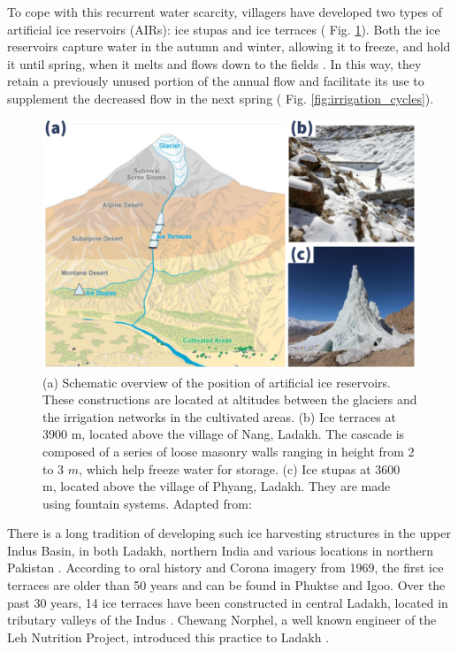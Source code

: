To cope with this recurrent water scarcity, villagers have developed two types of artificial ice reservoirs
(AIRs): ice stupas and ice terraces ( Fig. \ref{fig:AIRforms}). Both the ice reservoirs capture water in the
autumn and winter, allowing it to freeze, and hold it until spring, when it melts and flows down to the fields
\citep{ipccChapterHighMountain2019, vinceGlacierMan2009, clouseLadakhArtificialGlaciers2017,
nusserSociohydrologyArtificialGlaciers2019}. In this way, they retain a previously unused portion of the annual
flow and facilitate its use to supplement the decreased flow in the next spring ( Fig.
\ref{fig:irrigation_cycles}).

\begin{figure}[t]
\centering
\includegraphics[width=12cm]{figs/AIR_forms.jpg}

\caption{(a) Schematic overview of the position of artificial ice reservoirs. These constructions are located at
  altitudes between the glaciers and the irrigation networks in the cultivated areas. (b) Ice terraces at 3900
  m, located above the village of Nang, Ladakh. The cascade is composed of a series of loose masonry walls
  ranging in height from 2 to 3 $m$, which help freeze water for storage. (c) Ice stupas at 3600 m, located
above the village of Phyang, Ladakh. They are made using fountain systems. Adapted from:
\cite{nusserLocalKnowledgeGlobal2016}}

\label{fig:AIRforms}
\end{figure}

There is a long tradition of developing such ice harvesting structures in the upper Indus Basin, in both Ladakh,
northern India \citep{labbalTraditionalOasesLadakh2000, nusserIrrigationDevelopmentUpper2012} and various
locations in northern Pakistan \citep{kreutzmannScarcityOpulenceWater2011}. According to oral history and Corona
imagery from 1969, the first ice terraces are older than 50 years and can be found in Phuktse and Igoo. Over the
past 30 years, 14 ice terraces have been constructed in central Ladakh, located in
tributary valleys of the Indus \citep{norphelArtificialGlacierHigh2009,
nusserSociohydrologyArtificialGlaciers2019}. Chewang Norphel, a well known engineer of the Leh Nutrition
Project, introduced this practice to Ladakh \citep{vinceGlacierMan2009}.

